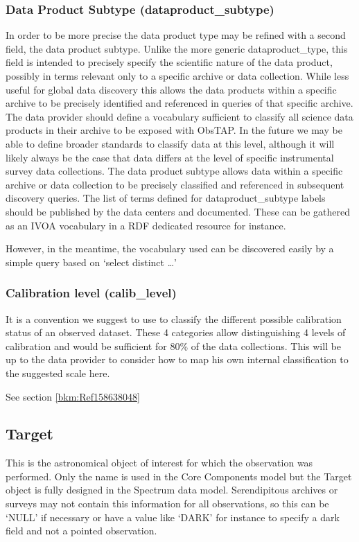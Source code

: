 \documentclass[11pt,a4paper]{ivoa}
\begin{document}
\subsubsection{Data Product Subtype (dataproduct\_subtype)}
\label{bkm:Ref291536287}In order to be more precise the data product type may be refined with a second field, the data
product subtype.  Unlike the more generic dataproduct\_type, this field is intended to precisely specify the scientific
nature of the data product, possibly in terms relevant only to a specific archive or data collection.  While less
useful for global data discovery this allows the data products within a specific archive to be precisely identified and
referenced in queries of that specific archive.  The data provider should define a vocabulary sufficient to classify
all science data products in their archive to be exposed with ObsTAP.  In the future we may be able to define broader
standards to classify data at this level, although it will likely always be the case that data differs at the level of
specific instrumental survey data collections. The data product subtype allows data within a specific archive or data
collection to be precisely classified and referenced in subsequent discovery queries. The list of terms defined for
dataproduct\_subtype labels should be published by the data centers and documented. These can be gathered as an IVOA
vocabulary in a RDF dedicated resource for instance.

However, in the meantime, the vocabulary used can be discovered easily by a simple query based on `select distinct
{\dots}'

\subsubsection{Calibration level (calib\_level)}
It is a convention we suggest to use to classify the different possible calibration status of an observed dataset. 
These 4 categories allow distinguishing 4 levels of calibration and would be sufficient for 80\% of the data
collections.  This will be up to the data provider to consider how to map his own internal classification to the
suggested scale here.  

See section \ref{bkm:Ref158638048}

\subsection{Target}
This is the astronomical object of interest for which the observation was performed. Only the name is used in the Core
Components model but the Target object is fully designed in the Spectrum data model. Serendipitous archives or surveys
may not contain this information for all observations, so this can be `NULL' if necessary or have a value like `DARK'
for instance to specify a dark field and not a pointed observation.
\end{document}

